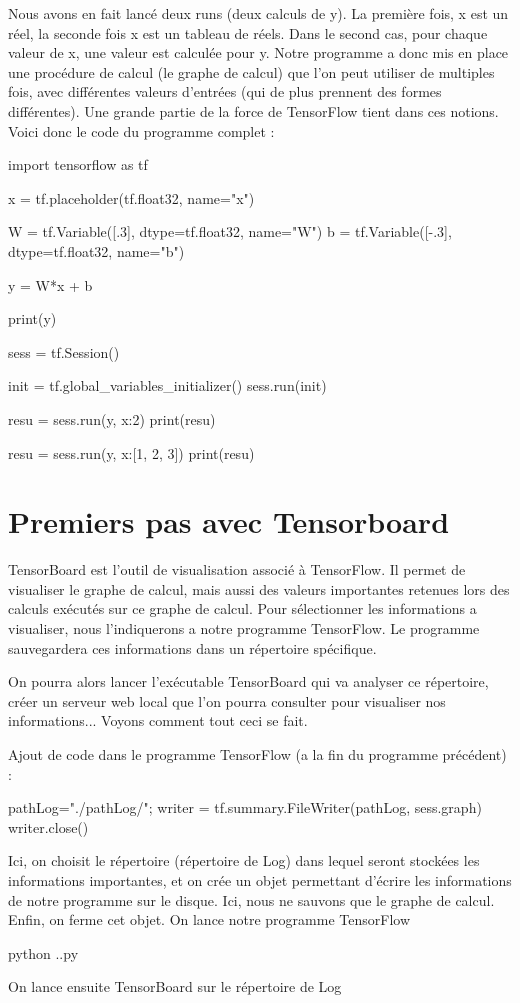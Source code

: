\documentclass[a4paper,11pt]{book}
\theoremstyle{theo}
\begin{document}
\begin{mypython} 
[0.3]
[0.  0.3 0.6]
\end{mypython} 

Nous avons en fait lancé deux runs (deux calculs de y). La première fois, x est un réel, la seconde fois x est un tableau de réels. Dans le second cas, pour chaque valeur de x, une valeur est calculée pour y.
Notre programme a donc mis en place une procédure de calcul (le graphe de calcul) que l'on peut utiliser de multiples fois, avec différentes valeurs d'entrées (qui de plus prennent des formes différentes).
Une grande partie de la force de TensorFlow tient dans ces notions.
Voici donc le code du programme complet :

\begin{mypython} 
import tensorflow as tf

x = tf.placeholder(tf.float32, name="x")

W = tf.Variable([.3], dtype=tf.float32, name="W")
b = tf.Variable([-.3], dtype=tf.float32, name="b")

y = W*x + b

print(y)

sess = tf.Session()

init = tf.global_variables_initializer()
sess.run(init)

resu = sess.run(y, {x:2}) 
print(resu)

resu = sess.run(y, {x:[1, 2, 3]}) 
print(resu)
\end{mypython} 

\section{Premiers pas avec Tensorboard}

TensorBoard est l'outil de visualisation associé à TensorFlow. Il permet de visualiser le graphe de calcul, mais aussi des valeurs importantes retenues lors des calculs exécutés sur ce graphe de calcul.
Pour sélectionner les informations a visualiser, nous l'indiquerons a notre programme TensorFlow. Le programme sauvegardera ces informations dans un répertoire spécifique.

On pourra alors lancer l'exécutable TensorBoard qui va analyser ce répertoire, créer un serveur web local que l'on pourra consulter pour visualiser nos informations...
Voyons comment tout ceci se fait.


Ajout de code dans le programme TensorFlow (a la fin du programme précédent) :
\begin{mypython}
pathLog="./pathLog/";
writer = tf.summary.FileWriter(pathLog, sess.graph)
writer.close()
\end{mypython}
Ici, on choisit le répertoire (répertoire de Log) dans lequel seront stockées les informations importantes, et on crée un objet permettant d'écrire les informations de notre programme sur le disque. Ici, nous ne sauvons que le graphe de calcul. Enfin, on ferme cet objet.
On lance notre programme TensorFlow 
\begin{mybash}
python .\premiersPas.py
\end{mybash}
On lance ensuite TensorBoard sur le répertoire de Log 
\end{document}
